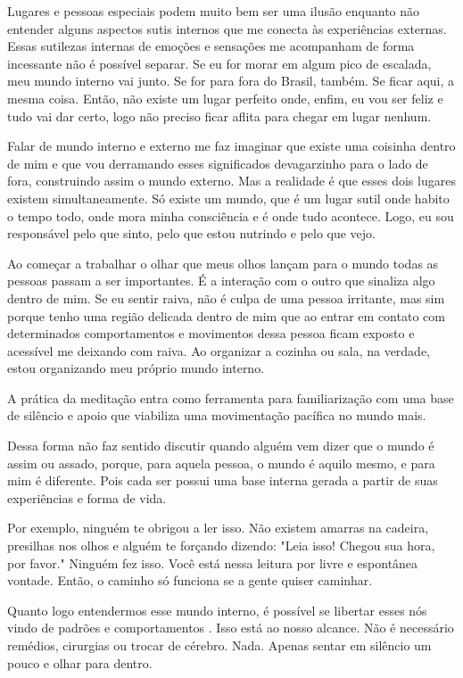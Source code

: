 Lugares e pessoas especiais podem muito bem ser uma ilusão enquanto não entender alguns aspectos sutis internos que me conecta às experiências externas. Essas sutilezas internas de emoções e sensações me acompanham de forma incessante não é possível separar. Se eu for morar em algum pico de escalada, meu mundo interno vai junto. Se for para fora do Brasil, também. Se ficar aqui, a mesma coisa. Então, não existe um lugar perfeito onde, enfim, eu vou ser feliz e tudo vai dar certo, logo não preciso ficar aflita para chegar em lugar nenhum.

Falar de mundo interno e externo me faz imaginar que existe uma coisinha dentro de mim e que vou derramando esses significados devagarzinho para o lado de fora, construindo assim o mundo externo. Mas a realidade é que esses dois lugares existem simultaneamente. Só existe um mundo, que é um lugar sutil onde habito o tempo todo, onde mora minha consciência e é onde tudo acontece. Logo, eu sou responsável pelo que sinto, pelo que estou nutrindo e pelo que vejo. 

Ao começar a trabalhar o olhar que meus olhos lançam para o mundo todas as pessoas passam a ser importantes. É a interação com o outro que sinaliza algo dentro de mim. Se eu sentir raiva, não é culpa de uma pessoa irritante, mas sim porque tenho uma região delicada dentro de mim que ao entrar em contato com determinados comportamentos e movimentos dessa pessoa ficam exposto e acessível me deixando com raiva. Ao organizar a cozinha ou sala, na verdade, estou organizando meu próprio mundo interno. 

A prática da meditação entra como ferramenta para familiarização com uma base de silêncio e apoio que viabiliza uma movimentação pacífica no mundo mais. 



Dessa forma não faz sentido discutir quando alguém vem dizer que o mundo é assim ou assado, porque, para aquela pessoa, o mundo é aquilo mesmo, e para mim é diferente. Pois cada ser possui uma base interna gerada a partir de suas experiências e forma de vida.

Por exemplo, ninguém te obrigou a ler isso. Não existem amarras na cadeira, presilhas nos olhos e alguém te forçando dizendo: "Leia isso! Chegou sua hora, por favor." Ninguém fez isso. Você está nessa leitura por livre e espontânea vontade. Então, o caminho só funciona se a gente quiser caminhar.

Quanto logo entendermos esse mundo interno, é possível se libertar esses nós vindo de padrões e comportamentos . Isso está ao nosso alcance. Não é necessário remédios, cirurgias ou trocar de cérebro. Nada. Apenas sentar em silêncio um pouco e olhar para dentro.

